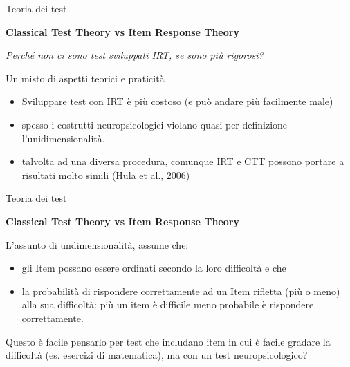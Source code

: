 \documentclass[
  ignorenonframetext,
]{beamer}
\providecommand{\tightlist}{%
  \setlength{\itemsep}{0pt}\setlength{\parskip}{0pt}}
\begin{document}
\begin{frame}{Teoria dei test}
\label{teoria-dei-test-7}
\begin{center}
  \textbf{Classical Test Theory vs Item Response Theory}
\end{center}

\emph{Perché non ci sono test sviluppati IRT, se sono più rigorosi?}
\pause

Un misto di aspetti teorici e praticità \pause

\begin{itemize}
\tightlist
\item
  Sviluppare test con IRT è più costoso (e può andare più facilmente
  male)
\item
  spesso i costrutti neuropsicologici violano quasi per definizione
  l'unidimensionalità.
\item
  talvolta ad una diversa procedura, comunque IRT e CTT possono portare
  a risultati molto simili
  (\href{https://doi.org/10.1044/1092-4388(2006/003)}{Hula et al.,
  2006})
\end{itemize}
\end{frame}

\begin{frame}{Teoria dei test}
\label{teoria-dei-test-8}
\begin{center}
  \textbf{Classical Test Theory vs Item Response Theory}
\end{center}

L'assunto di undimensionalità, assume che:

\begin{itemize}[<*>] 
\item gli Item possano essere ordinati secondo la loro difficoltà e che
\item la probabilità di rispondere correttamente ad un Item rifletta (più o meno) alla sua difficoltà: più un item è difficile meno probabile è rispondere correttamente.
\end{itemize}

Questo è facile pensarlo per test che includano item in cui è facile
gradare la difficoltà (es. esercizi di matematica), ma con un test
neuropsicologico?
\end{frame}
\end{document}
